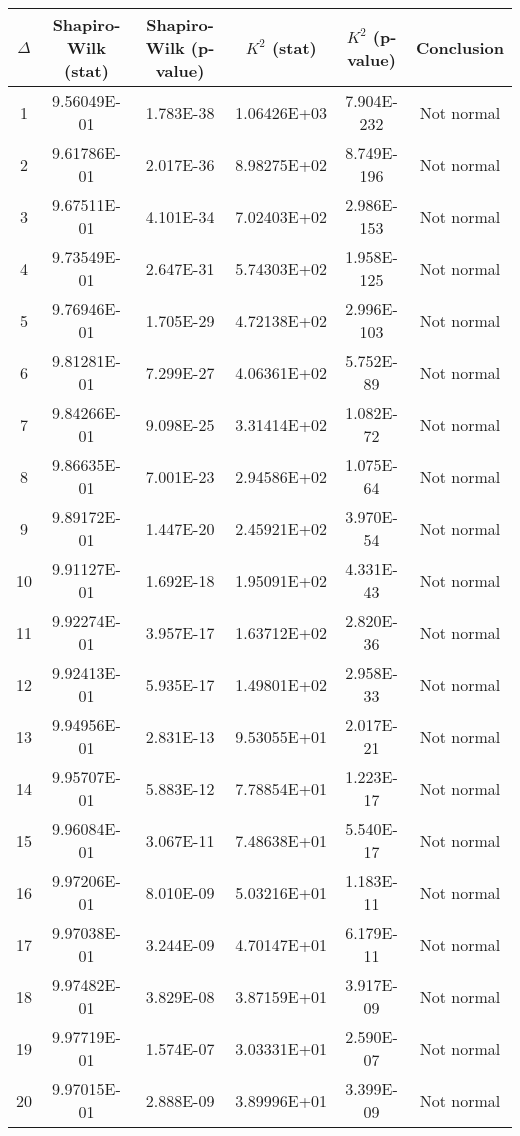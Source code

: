 \begin{table}[h]
	\begin{tabular}{|c|c|c|c|c|c|}
		\hline
		$\Delta$ &  Shapiro-Wilk (stat) & Shapiro-Wilk (p-value) & $K^2$ (stat) & $K^2$ (p-value) & Conclusion\\\hline
		\hline
		1 & 9.56049E-01 & 1.783E-38 & 1.06426E+03 & 7.904E-232 & Not normal\\\hline
		2 & 9.61786E-01 & 2.017E-36 & 8.98275E+02 & 8.749E-196 & Not normal\\\hline
		3 & 9.67511E-01 & 4.101E-34 & 7.02403E+02 & 2.986E-153 & Not normal\\\hline
		4 & 9.73549E-01 & 2.647E-31 & 5.74303E+02 & 1.958E-125 & Not normal\\\hline
		5 & 9.76946E-01 & 1.705E-29 & 4.72138E+02 & 2.996E-103 & Not normal\\\hline
		6 & 9.81281E-01 & 7.299E-27 & 4.06361E+02 & 5.752E-89 & Not normal\\\hline
		7 & 9.84266E-01 & 9.098E-25 & 3.31414E+02 & 1.082E-72 & Not normal\\\hline
		8 & 9.86635E-01 & 7.001E-23 & 2.94586E+02 & 1.075E-64 & Not normal\\\hline
		9 & 9.89172E-01 & 1.447E-20 & 2.45921E+02 & 3.970E-54 & Not normal\\\hline
		10 & 9.91127E-01 & 1.692E-18 & 1.95091E+02 & 4.331E-43 & Not normal\\\hline
		11 & 9.92274E-01 & 3.957E-17 & 1.63712E+02 & 2.820E-36 & Not normal\\\hline
		12 & 9.92413E-01 & 5.935E-17 & 1.49801E+02 & 2.958E-33 & Not normal\\\hline
		13 & 9.94956E-01 & 2.831E-13 & 9.53055E+01 & 2.017E-21 & Not normal\\\hline
		14 & 9.95707E-01 & 5.883E-12 & 7.78854E+01 & 1.223E-17 & Not normal\\\hline
		15 & 9.96084E-01 & 3.067E-11 & 7.48638E+01 & 5.540E-17 & Not normal\\\hline
		16 & 9.97206E-01 & 8.010E-09 & 5.03216E+01 & 1.183E-11 & Not normal\\\hline
		17 & 9.97038E-01 & 3.244E-09 & 4.70147E+01 & 6.179E-11 & Not normal\\\hline
		18 & 9.97482E-01 & 3.829E-08 & 3.87159E+01 & 3.917E-09 & Not normal\\\hline
		19 & 9.97719E-01 & 1.574E-07 & 3.03331E+01 & 2.590E-07 & Not normal\\\hline
		20 & 9.97015E-01 & 2.888E-09 & 3.89996E+01 & 3.399E-09 & Not normal\\\hline

\end{tabular}
\end{table}
